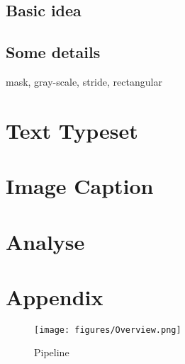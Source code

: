 \documentclass{article}
\begin{document}
\subsection{Basic idea}

\subsection{Some details}
mask, gray-scale, stride, rectangular

\section{Text Typeset}

\section{Image Caption}


\section{Analyse}





\appendix

\section{Appendix}
\begin{figure}
    \centering
    \texttt{[image: figures/Overview.png]}
    \caption{Pipeline}
    \label{fig:fig1}
\end{figure}
\end{document}
